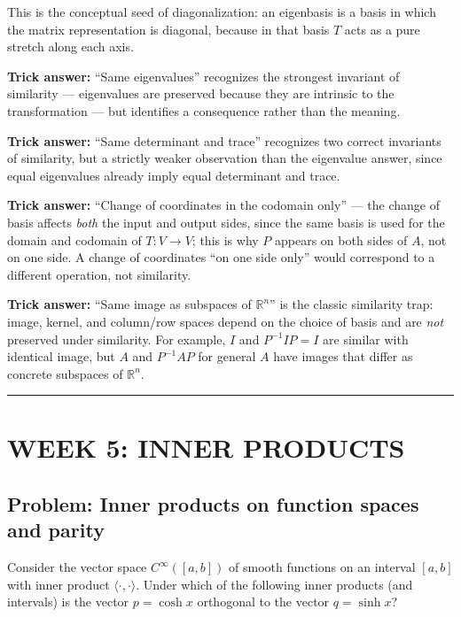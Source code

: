 \documentclass[12pt]{amsart}
\newcommand{\divider}{
  \vspace{-1em}
  \noindent
  \raisebox{-0.15ex}{\textbullet}%
  \hspace{0.5em}%
  \rule[0.5ex]{0.95\textwidth}{1.0pt}%
  \hspace{0.5em}%
  \raisebox{-0.15ex}{\textbullet}%
  \vspace{0em}
}
\begin{document}
This is the conceptual seed of diagonalization: an eigenbasis is a basis in
which the matrix representation is diagonal, because in that basis $T$ acts
as a pure stretch along each axis.

\textbf{Trick answer:}
``Same eigenvalues'' recognizes the strongest invariant of similarity ---
eigenvalues are preserved because they are intrinsic to the transformation
--- but identifies a consequence rather than the meaning.

\textbf{Trick answer:}
``Same determinant and trace'' recognizes two correct invariants of
similarity, but a strictly weaker observation than the eigenvalue answer,
since equal eigenvalues already imply equal determinant and trace.

\textbf{Trick answer:}
``Change of coordinates in the codomain only'' --- the change of basis
affects \emph{both} the input and output sides, since the same basis is
used for the domain and codomain of $T : V \to V$; this is why $P$ appears
on both sides of $A$, not on one side. A change of coordinates ``on one
side only'' would correspond to a different operation, not similarity.

\textbf{Trick answer:}
``Same image as subspaces of $\mathbb{R}^n$'' is the classic similarity
trap: image, kernel, and column/row spaces depend on the choice of basis
and are \emph{not} preserved under similarity. For example, $I$ and
$P^{-1} I P = I$ are similar with identical image, but $A$ and $P^{-1} A P$
for general $A$ have images that differ as concrete subspaces of $\mathbb{R}^n$.

\divider

\section*{WEEK 5: INNER PRODUCTS}

\subsection*{Problem: Inner products on function spaces and parity}

Consider the vector space $C^\infty([a,b])$ of smooth functions on an interval
$[a,b]$ with inner product $\langle \cdot, \cdot \rangle$. Under which of the
following inner products (and intervals) is the vector $p = \cosh x$ orthogonal
to the vector $q = \sinh x$?
\end{document}
